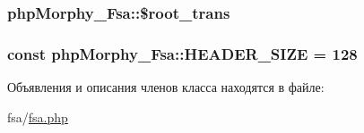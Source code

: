 \hypertarget{classphpMorphy__Fsa_a1b2d07e78560d45d7cc2d57098259e39}{
\subsubsection[{\$root\_\-trans}]{\setlength{\rightskip}{0pt plus 5cm}phpMorphy\_\-Fsa::\$root\_\-trans}}
\label{classphpMorphy__Fsa_a1b2d07e78560d45d7cc2d57098259e39}
\hypertarget{classphpMorphy__Fsa_afd061cb6c86a2fb54b531d61419ed527}{
\subsubsection[{HEADER\_\-SIZE}]{\setlength{\rightskip}{0pt plus 5cm}const {\bf phpMorphy\_\-Fsa::HEADER\_\-SIZE} = 128}}
\label{classphpMorphy__Fsa_afd061cb6c86a2fb54b531d61419ed527}


Объявления и описания членов класса находятся в файле:\begin{DoxyCompactItemize}
\item 
fsa/\hyperlink{fsa_8php}{fsa.php}\end{DoxyCompactItemize}
